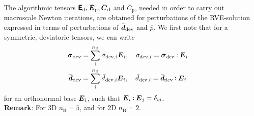 \documentclass[10pt,a4paper]{article}
\newcommand{\ded}{\mathrm{d}}
\newcommand{\dep}{\mathrm{p}}
\begin{document}
The algorithmic tensors $\bar{\tf{E}}_\ded, \bar{\ts E }_\dep, \bar{\ts C}_\ded$ and $\bar{C}_\dep$, needed in order to carry out macroscale Newton iterations, are obtained for
perturbations of the RVE-solution expressed in terms of perturbations of $\bar{\boldsymbol{d}}_{\mathrm{dev}}$ and $\bar{p}$.
We first note that for a symmetric, deviatoric tensors, we can write
\begin{align}
 \bar{\boldsymbol{\sigma}}_{\mathrm{dev}} &= \sum_i^{n_{\mathrm{B}}} \bar{\sigma}_{\mathrm{dev},i} \boldsymbol{E}_i,\quad \bar{\sigma}_{\mathrm{dev},i} = \bar{\boldsymbol{\sigma}}_{\mathrm{dev}}\mathbin{\vcentcolon} \boldsymbol{E}_i\\
 \bar{\boldsymbol{d}}_{\mathrm{dev}} &= \sum_i^{n_{\mathrm{B}}} \bar{d}_{\mathrm{dev},i} \boldsymbol{E}_i,\quad  \bar{d}_{\mathrm{dev},i} = \bar{\boldsymbol{d}}_{\mathrm{dev}}\mathbin{\vcentcolon} \boldsymbol{E}_i
\end{align}
for an orthonormal base $\boldsymbol{E}_i$, such that $\boldsymbol{E}_i \mathbin{\vcentcolon} \boldsymbol{E}_j = \delta_{ij} $.\\
\textbf{Remark}: For 3D $n_{\mathrm{B}} = 5$, and for 2D $n_{\mathrm{B}} = 2$.
\end{document}
